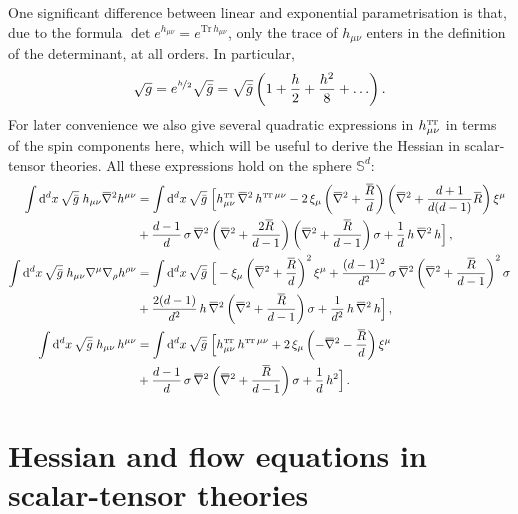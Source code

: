 \documentclass[11pt]{book} %
\newcommand{\overbar}[1]{\mkern 1.5mu\overline{\mkern-1.5mu#1\mkern-1.5mu}\mkern 1.5mu}
\newcommand\TTspace{ -1pt }
\newcommand\TT{ \scriptscriptstyle{\mathrm{T\hspace{\TTspace}T}} }
\newcommand\hTTmunu{ h^{\scriptscriptstyle{\mathrm{T\hspace{\TTspace}T}}}_{\mu\nu} }
\newcommand{\bnabla}{\overbar \nabla}
\newcommand{\bR}{\overbar R}
\newcommand{\Tr}{\mathrm{Tr}}
\numberwithin{equation}{chapter}
\begin{document}
\begin{appendices}
One significant difference between linear and exponential parametrisation is that,
due to the formula $\det e^{h_{\mu\nu}} = e^{\Tr \, h_{\mu\nu}}$, only the trace
of $h_{\mu\nu}$ enters in the definition of the determinant, at all orders.
In particular,
\begin{align}
  \sqrt{g} = e^{\nicefrac{h}{2}} \sqrt{\bar g} =
  \sqrt{\bar g}
  \left(
    1 + \frac h2 + \frac{h^2}{8} + \ldots
  \right) .
\end{align}
For later convenience we also give several quadratic expressions in $\hTTmunu$
in terms of the spin components here, which will be useful to derive
the Hessian in scalar-tensor theories. All these expressions hold on the
sphere $\mathbb S^d$:
\begin{align}
  \int \mathrm d^dx \, \sqrt{\bar g} \; h_{\mu\nu} \bnabla^2 h^{\mu\nu} &
  = \int \mathrm d^dx \, \sqrt{\bar g} \;
  \Big[
    \hTTmunu \, \bnabla^2 \, h^{{\TT}\,\mu\nu}
    - 2 \, \xi_\mu \left( \bnabla^2 + \frac{\bR}{d} \right)
    \left( \bnabla^2 + \frac{d+1}{d(d-1)} \bR \right) \xi^\mu \nonumber \\
    & + \frac{d-1}{d} \, \sigma \, \bnabla^2
    \left( \bnabla^2 + \frac{2\bR}{d-1} \right)
    \left( \bnabla^2 + \frac{\bR}{d-1} \right) \sigma
    + \frac{1}{d} \, h \, \bnabla^2 \, h
  \Big] \,, \\
  \int \mathrm d^dx \, \sqrt{\bar g} \; h_{\mu\nu} \nabla^\mu \nabla_\rho h^{\rho\nu} &=
  \int \mathrm d^dx \, \sqrt{\bar g} \;
  \Big[
    - \xi_\mu \left( \bnabla^2 + \frac{\bR}{d} \right)^2 \xi^\mu
    + \frac{(d-1)^2}{d^2} \, \sigma \, \bnabla^2
    \left( \bnabla^2 + \frac{\bR}{d-1} \right)^2 \sigma \nonumber \\
    & + \frac{2(d-1)}{d^2} \, h \, \bnabla^2 \left( \bnabla^2 + \frac{\bR}{d-1} \right) \sigma
    + \frac{1}{d^2} \, h \, \bnabla^2 \, h
  \Big] \,, \\
  \int \mathrm d^dx \, \sqrt{\bar g} \; h_{\mu\nu} \, h^{\mu\nu} &=
  \int \mathrm d^dx \, \sqrt{\bar g} \;
  \Big[\hTTmunu \, h^{{\TT}\,\mu\nu}
    + 2 \, \xi_\mu \left( -\bnabla^2 - \frac{\bR}{d} \right) \xi^\mu \nonumber \\
    & +\frac{d-1}{d} \, \sigma \, \bnabla^2 \left( \bnabla^2 + \frac{\bR}{d-1} \right) \sigma
    + \frac{1}{d} \, h^2
  \Big] \,.
  \label{hterms}
\end{align}


\chapter{Hessian and flow equations in scalar-tensor theories}
\label{app:Hessian}


\end{appendices}
\end{document}
